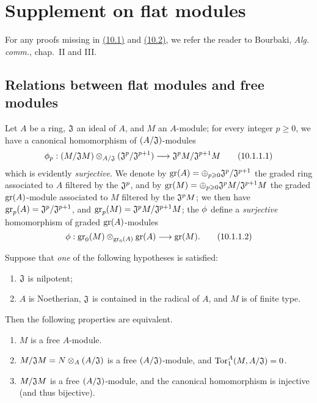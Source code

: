 \section{Supplement on flat modules}
\label{section:supplement-on-flat-modules}

For any proofs missing in \hyperref[subsection:relations-between-flat-modules-and-free-modules]{(10.1)} and \hyperref[subsection:local-flatness-criteria]{(10.2)}, we refer the reader to Bourbaki, \emph{Alg. comm.}, chap.~II and III.

\subsection{Relations between flat modules and free modules}
\label{subsection:relations-between-flat-modules-and-free-modules}

\begin{env}[10.1.1]
\label{0.10.1.1}
Let $A$ be a ring, $\mathfrak{J}$ an ideal of $A$, and $M$ an $A$-module;
for every integer $p\geq0$, we have a canonical homomorphism of $(A/\mathfrak{J})$-modules
\begin{equation*}
\label{0.10.1.1.1}
    \vphi_p: (M/\fk{J}M) \otimes_{A/\fk{J}} (\fk{J}^p/\fk{J}^{p+1}) \to \fk{J}^pM/\fk{J}^{p+1}M\tag{10.1.1.1}
\end{equation*}
which is evidently \emph{surjective}.
We denote by ${\mathop{\mathrm{gr}}\nolimits}(A)=\oplus_{p\geqslant0}\mathfrak{J}^p/\mathfrak{J}^{p+1}$ the graded ring associated to $A$ filtered by the $\mathfrak{J}^p$, and by ${\mathop{\mathrm{gr}}\nolimits}(M)=\oplus_{p\geqslant0}\mathfrak{J}^pM/\mathfrak{J}^{p+1}M$ the graded ${\mathop{\mathrm{gr}}\nolimits}(A)$-module associated to $M$ filtered by the $\mathfrak{J}^pM$;
we then have ${\mathop{\mathrm{gr}}\nolimits}_p(A)=\mathfrak{J}^p/\mathfrak{J}^{p+1}$, and ${\mathop{\mathrm{gr}}\nolimits}_p(M)=\mathfrak{J}^pM/\mathfrak{J}^{p+1}M$;
the $\phi$ define a \emph{surjective} homomorphism of graded ${\mathop{\mathrm{gr}}\nolimits}(A)$-modules
\begin{equation*}
\label{0.10.1.1.2}
    \vphi: \gr_0(M) \otimes_{\gr_0(A)} \gr(A) \to \gr(M).\tag{10.1.1.2}
\end{equation*}
\end{env}

\begin{env}[10.1.2]
\label{0.10.1.2}
Suppose that \emph{one} of the following hypotheses is satisfied:
\begin{enumerate}[label=\emph{(\roman*)}]
    \item $\mathfrak{J}$ is nilpotent;
    \item $A$ is Noetherian, $\mathfrak{J}$ is contained in the radical of $A$, and $M$ is of finite type.
\end{enumerate}
Then the following properties are equivalent.
\begin{enumerate}[label=\emph{(\alph*)}]
    \item $M$ is a free $A$-module.
    \item $M/\mathfrak{J}M=N\otimes_A(A/\mathfrak{J})$ is a free $(A/\mathfrak{J})$-module, and ${\mathop{\mathrm{Tor}}\nolimits}_1^A(M,A/\mathfrak{J})=0$.
    \item $M/\mathfrak{J}M$ is a free $(A/\mathfrak{J})$-module, and the canonical homomorphism  is injective (and thus bijective).
\end{enumerate}
\end{env}

